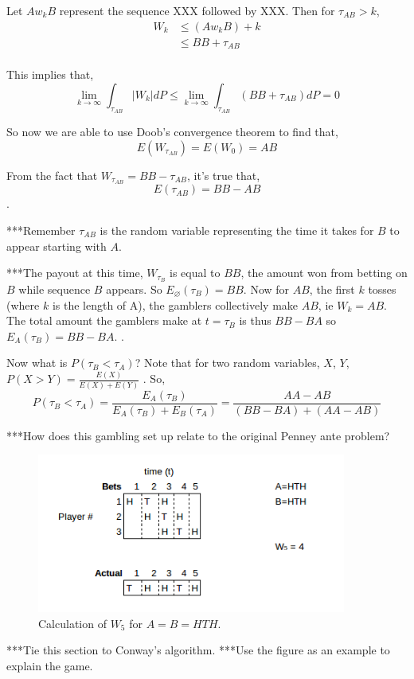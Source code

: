 \documentclass{article}
\numberwithin{mytheorem}{subsection} %
\begin{document}
		Let $Aw_k B$ represent the sequence XXX followed by XXX. Then for $\tau_{AB} > k$,
		\begin{equation}
		\begin{split}
		W_k & \leq (Aw_k B) + k \\
		    & \leq BB + \tau_{AB} \\
		\end{split}
		\end{equation}

		This implies that,
		$$\lim_{k\rightarrow \infty} \int_{\tau_{AB}} |W_k|dP \leq \lim_{k\rightarrow \infty} \int_{\tau_{AB}} (BB + \tau_{AB}) dP = 0$$

		So now we are able to use Doob's convergence theorem to find that,
		$$E(W_{\tau_{AB}}) = E(W_0) = AB$$

		From the fact that $W_{\tau_{AB}} = BB - \tau_{AB}$, it's true that,
		$$E(\tau_{AB}) = BB - AB$$.

		***Remember $\tau_{AB}$ is the random variable representing the time it takes for $B$ to appear starting with $A$.

		***The payout at this time, $W_{\tau_{B}}$ is equal to $BB$, the amount won from betting on $B$ while sequence $B$ appears. So $E_{\varnothing}(\tau_{B}) = BB$. Now for $AB$, the first $k$ tosses (where $k$ is the length of A), the gamblers collectively make $AB$, ie $W_k = AB$. The total amount the gamblers make at $t = \tau_{B}$ is thus $BB - BA$ so $E_A(\tau_{B}) = BB - BA$. \cite{grinstead}.

		Now what is $P(\tau_{B} < \tau_{A})$? Note that for two random variables, $X$, $Y$, $P(X > Y) = \frac{E(X)}{E(X) + E(Y)}$ \cite{grinstead}. So, $$P(\tau_{B} < \tau_{A}) = \frac{E_A(\tau_{B})}{E_A(\tau_{B}) + E_B(\tau_{A})} = \frac{AA - AB}{(BB - BA) + (AA - AB)}$$

		***How does this gambling set up relate to the original Penney ante problem?

		\begin{figure}[h]
			\begin{center}
				\includegraphics[width=4.0in]{Martingaletable}
			\end{center}
		
			\caption{Calculation of $W_5$ for $A = B = HTH$.}
			\label{fig}
		\end{figure}
		***Tie this section to Conway's algorithm. 
		***Use the figure as an example to explain the game.
\end{document}
